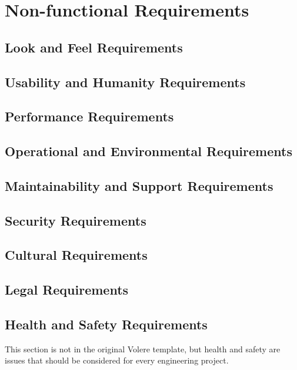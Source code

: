 \documentclass[12pt, titlepage]{article}
\begin{document}
\section{Non-functional Requirements}

\subsection{Look and Feel Requirements}

\subsection{Usability and Humanity Requirements}

\subsection{Performance Requirements}

\subsection{Operational and Environmental Requirements}

\subsection{Maintainability and Support Requirements}

\subsection{Security Requirements}

\subsection{Cultural Requirements}

\subsection{Legal Requirements}

\subsection{Health and Safety Requirements}

This section is not in the original Volere template, but health and safety are
issues that should be considered for every engineering project.
\end{document}
